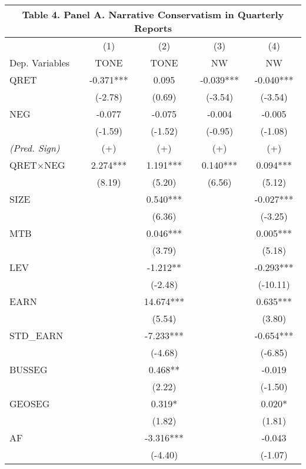 \begin{table}[H]	\label{T4PA}%
	\begin{center}
		\begin{tabular}{lcccc}
			\multicolumn{5}{c}{\textbf{Table 4. Panel A. Narrative Conservatism in Quarterly Reports}} \\
			\midrule
			\midrule
			& (1) & (2) & (3) & (4) \\
			Dep. Variables & TONE & TONE & NW & NW \\
			\midrule
			QRET & -0.371*** & 0.095 & -0.039*** & -0.040*** \\
			& (-2.78) & (0.69) & (-3.54) & (-3.54) \\
			NEG & -0.077 & -0.075 & -0.004 & -0.005 \\
			& (-1.59) & (-1.52) & (-0.95) & (-1.08) \\
			\rowcolor[rgb]{ .906,  .902,  .902} \textit{(Pred. Sign)} & (+) & (+) & (+) & (+) \\
			\rowcolor[rgb]{ .906,  .902,  .902} QRET$\times$NEG & 2.274*** & 1.191*** & 0.140*** & 0.094*** \\
			\rowcolor[rgb]{ .906,  .902,  .902} & (8.19) & (5.20) & (6.56) & (5.12) \\
			SIZE &   & 0.540*** &   & -0.027*** \\
			&   & (6.36) &   & (-3.25) \\
			MTB &   & 0.046*** &   & 0.005*** \\
			&   & (3.79) &   & (5.18) \\
			LEV &   & -1.212** &   & -0.293*** \\
			&   & (-2.48) &   & (-10.11) \\
			EARN &   & 14.674*** &   & 0.635*** \\
			&   & (5.54) &   & (3.80) \\
			STD\_EARN &   & -7.233*** &   & -0.654*** \\
			&   & (-4.68) &   & (-6.85) \\
			BUSSEG &   & 0.468** &   & -0.019 \\
			&   & (2.22) &   & (-1.50) \\
			GEOSEG &   & 0.319* &   & 0.020* \\
			&   & (1.82) &   & (1.81) \\
			AF &   & -3.316*** &   & -0.043 \\
			&   & (-4.40) &   & (-1.07) \\

\end{tabular}
\end{center}
\end{table}
